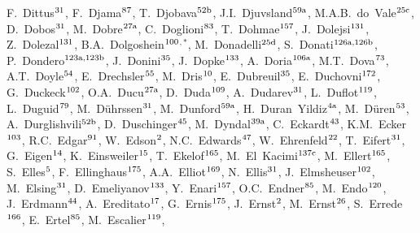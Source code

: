 \begin{flushleft}
F.~Dittus$^\textrm{\scriptsize 31}$,
F.~Djama$^\textrm{\scriptsize 87}$,
T.~Djobava$^\textrm{\scriptsize 52b}$,
J.I.~Djuvsland$^\textrm{\scriptsize 59a}$,
M.A.B.~do~Vale$^\textrm{\scriptsize 25c}$,
D.~Dobos$^\textrm{\scriptsize 31}$,
M.~Dobre$^\textrm{\scriptsize 27a}$,
C.~Doglioni$^\textrm{\scriptsize 83}$,
T.~Dohmae$^\textrm{\scriptsize 157}$,
J.~Dolejsi$^\textrm{\scriptsize 131}$,
Z.~Dolezal$^\textrm{\scriptsize 131}$,
B.A.~Dolgoshein$^\textrm{\scriptsize 100}$$^{,*}$,
M.~Donadelli$^\textrm{\scriptsize 25d}$,
S.~Donati$^\textrm{\scriptsize 126a,126b}$,
P.~Dondero$^\textrm{\scriptsize 123a,123b}$,
J.~Donini$^\textrm{\scriptsize 35}$,
J.~Dopke$^\textrm{\scriptsize 133}$,
A.~Doria$^\textrm{\scriptsize 106a}$,
M.T.~Dova$^\textrm{\scriptsize 73}$,
A.T.~Doyle$^\textrm{\scriptsize 54}$,
E.~Drechsler$^\textrm{\scriptsize 55}$,
M.~Dris$^\textrm{\scriptsize 10}$,
E.~Dubreuil$^\textrm{\scriptsize 35}$,
E.~Duchovni$^\textrm{\scriptsize 172}$,
G.~Duckeck$^\textrm{\scriptsize 102}$,
O.A.~Ducu$^\textrm{\scriptsize 27a}$,
D.~Duda$^\textrm{\scriptsize 109}$,
A.~Dudarev$^\textrm{\scriptsize 31}$,
L.~Duflot$^\textrm{\scriptsize 119}$,
L.~Duguid$^\textrm{\scriptsize 79}$,
M.~D\"uhrssen$^\textrm{\scriptsize 31}$,
M.~Dunford$^\textrm{\scriptsize 59a}$,
H.~Duran~Yildiz$^\textrm{\scriptsize 4a}$,
M.~D\"uren$^\textrm{\scriptsize 53}$,
A.~Durglishvili$^\textrm{\scriptsize 52b}$,
D.~Duschinger$^\textrm{\scriptsize 45}$,
M.~Dyndal$^\textrm{\scriptsize 39a}$,
C.~Eckardt$^\textrm{\scriptsize 43}$,
K.M.~Ecker$^\textrm{\scriptsize 103}$,
R.C.~Edgar$^\textrm{\scriptsize 91}$,
W.~Edson$^\textrm{\scriptsize 2}$,
N.C.~Edwards$^\textrm{\scriptsize 47}$,
W.~Ehrenfeld$^\textrm{\scriptsize 22}$,
T.~Eifert$^\textrm{\scriptsize 31}$,
G.~Eigen$^\textrm{\scriptsize 14}$,
K.~Einsweiler$^\textrm{\scriptsize 15}$,
T.~Ekelof$^\textrm{\scriptsize 165}$,
M.~El~Kacimi$^\textrm{\scriptsize 137c}$,
M.~Ellert$^\textrm{\scriptsize 165}$,
S.~Elles$^\textrm{\scriptsize 5}$,
F.~Ellinghaus$^\textrm{\scriptsize 175}$,
A.A.~Elliot$^\textrm{\scriptsize 169}$,
N.~Ellis$^\textrm{\scriptsize 31}$,
J.~Elmsheuser$^\textrm{\scriptsize 102}$,
M.~Elsing$^\textrm{\scriptsize 31}$,
D.~Emeliyanov$^\textrm{\scriptsize 133}$,
Y.~Enari$^\textrm{\scriptsize 157}$,
O.C.~Endner$^\textrm{\scriptsize 85}$,
M.~Endo$^\textrm{\scriptsize 120}$,
J.~Erdmann$^\textrm{\scriptsize 44}$,
A.~Ereditato$^\textrm{\scriptsize 17}$,
G.~Ernis$^\textrm{\scriptsize 175}$,
J.~Ernst$^\textrm{\scriptsize 2}$,
M.~Ernst$^\textrm{\scriptsize 26}$,
S.~Errede$^\textrm{\scriptsize 166}$,
E.~Ertel$^\textrm{\scriptsize 85}$,
M.~Escalier$^\textrm{\scriptsize 119}$,
$$
\end{flushleft}
